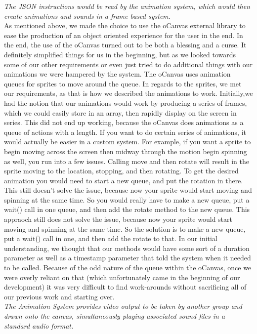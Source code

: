\documentclass[12pt]{article}
\begin{document}
\textit{The JSON instructions would be read by the animation system, which would then create animations and sounds in a frame based system.}\\
As mentioned above, we made the choice to use the oCanvas external library to ease the production of an object oriented experience for the user in the end. In the end, the use of the oCanvas turned out to be both a blessing and a curse. It definitely simplified things for us in the beginning, but as we looked towards some of our other requirements or even just tried to do additional things with our animations we were hampered by the system. The oCanvas uses animation queues for sprites to move around the queue. In regards to the sprites, we met our requirements, as that is how we described the animations to work. Initially,we had the notion that our animations would work by producing a series of frames, which we could easily store in an array, then rapidly display on the screen in series. This did not end up working, because the oCanvas does animations as a queue of actions with a length. If you want to do certain series of animations, it would actually be easier in a custom system. For example, if you want a sprite to begin moving across the screen then midway through the motion begin spinning as well, you run into a few issues. Calling move and then rotate will result in the sprite moving to the location, stopping, and then rotating. To get the desired animation you would need to start a new queue, and put the rotation in there. This still doesn’t solve the issue, because now your sprite would start moving and spinning at the same time. So you would really have to make a new queue, put a wait() call in one queue, and then add the rotate method to the new queue. This appraoch still does not solve the issue, because now your sprite would start moving and spinning at the same time. So the solution is to make a new queue, put a wait() call in one, and then add the rotate to that. In our initial understanding, we thought that our methods would have some sort of a duration parameter as well as a timestamp parameter that told the system when it needed to be called. Because of the odd nature of the queue within the oCanvas, once we were overly reliant on that (which unfortunately came in the beginning of our development) it was very difficult to find work-arounds without sacrificing all of our previous work and starting over.\\

\textit{The Animation System provides video output to be taken by another group and drawn onto the canvas, simultaneously playing associated sound files in a standard audio format.}\\
\end{document}
